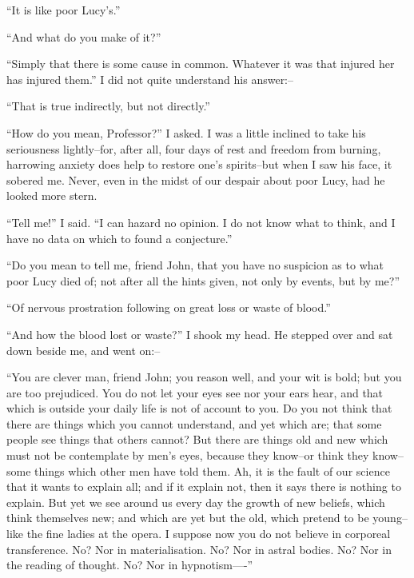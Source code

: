 \documentclass[12pt,openright]{book}
\begin{document}
“It is like poor Lucy’s.”

“And what do you make of it?”

“Simply that there is some cause in common. Whatever it was that injured her has injured them.” I did not quite understand his answer:–

“That is true indirectly, but not directly.”

“How do you mean, Professor?” I asked. I was a little inclined to take his seriousness lightly–for, after all, four days of rest and freedom from burning, harrowing anxiety does help to restore one’s spirits–but when I saw his face, it sobered me. Never, even in the midst of our despair about poor Lucy, had he looked more stern.

“Tell me!” I said. “I can hazard no opinion. I do not know what to think, and I have no data on which to found a conjecture.”

“Do you mean to tell me, friend John, that you have no suspicion as to what poor Lucy died of; not after all the hints given, not only by events, but by me?”

“Of nervous prostration following on great loss or waste of blood.”

“And how the blood lost or waste?” I shook my head. He stepped over and sat down beside me, and went on:–

“You are clever man, friend John; you reason well, and your wit is bold; but you are too prejudiced. You do not let your eyes see nor your ears hear, and that which is outside your daily life is not of account to you. Do you not think that there are things which you cannot understand, and yet which are; that some people see things that others cannot? But there are things old and new which must not be contemplate by men’s eyes, because they know–or think they know–some things which other men have told them. Ah, it is the fault of our science that it wants to explain all; and if it explain not, then it says there is nothing to explain. But yet we see around us every day the growth of new beliefs, which think themselves new; and which are yet but the old, which pretend to be young–like the fine ladies at the opera. I suppose now you do not believe in corporeal transference. No? Nor in materialisation. No? Nor in astral bodies. No? Nor in the reading of thought. No? Nor in hypnotism—-”
\end{document}
